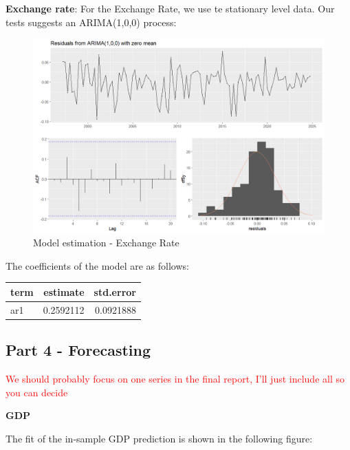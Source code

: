 \documentclass[
]{article}
\begin{document}
\textbf{Exchange rate}: For the Exchange Rate, we use te stationary
level data. Our tests suggests an ARIMA(1,0,0) process:

\begin{figure}

{\centering \includegraphics[width=0.8\linewidth]{../results/Exchange Rate_residuals} 

}

\caption{Model estimation - Exchange Rate}\label{fig:unnamed-chunk-12}
\end{figure}

The coefficients of the model are as follows:

\bgroup \table[H]
\centering
\caption{\label{tab:unnamed-chunk-13}Model coefficients Exchange Rate}
\centering
\begin{tabular}[t]{lrr}
\toprule
term & estimate & std.error\\
\midrule
ar1 & 0.2592112 & 0.0921888\\
\bottomrule
\end{tabular}
\endtable\egroup

\subsection*{Part 4 - Forecasting}

\textcolor{red}{We should probably focus on one series in the final report, I'll just include all so you can decide}

\textbf{GDP}

The fit of the in-sample GDP prediction is shown in the following
figure:
\end{document}
